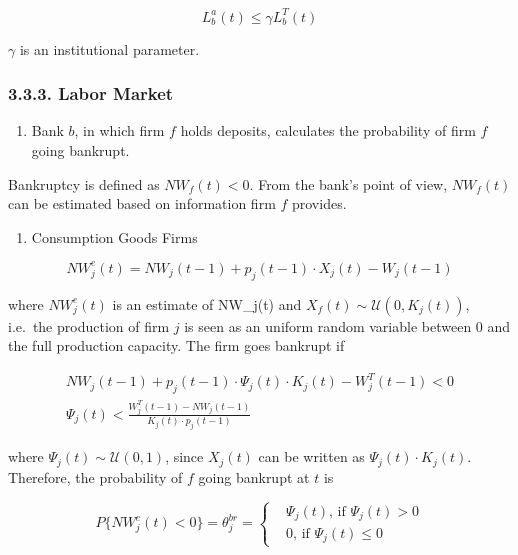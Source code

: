 \documentclass[11pt,]{article}
\providecommand{\tightlist}{%
\setlength{\itemsep}{0pt}\setlength{\parskip}{0pt}}
\begin{document}
\begin{equation}\label{maxloan}
  L_b^a(t) \leq \gamma L^T_b(t)
\end{equation}

\(\gamma\) is an institutional parameter.

\subsubsection{3.3.3. Labor Market}\label{labor-market}

\begin{enumerate}
\def\labelenumi{\alph{enumi}.}
\setcounter{enumi}{2}
\tightlist
\item
  Bank \(b\), in which firm \(f\) holds deposits, calculates the
  probability of firm \(f\) going bankrupt.
\end{enumerate}

Bankruptcy is defined as \(NW_f(t) < 0\). From the bank's point of view,
\(NW_f(t)\) can be estimated based on information firm \(f\) provides.

\begin{enumerate}
\def\labelenumi{\roman{enumi}.}
\tightlist
\item
  Consumption Goods Firms
\end{enumerate}

\begin{equation}
    NW^e_j(t) = NW_j(t-1) + p_j(t-1) \cdot X_j(t) - W_j(t-1)
  \end{equation}

where \(NW^e_j(t)\) is an estimate of NW\_j(t) and
\(X_f(t) \sim \mathcal{U}(0,K_j(t))\), i.e.~the production of firm \(j\)
is seen as an uniform random variable between 0 and the full production
capacity. The firm goes bankrupt if

\begin{equation}
  \begin{split}
    NW_j(t-1) + p_j(t-1) \cdot \Psi_j(t) \cdot K_j(t) - W_j^T(t-1) < 0 \\
    \Psi_j(t) < \frac{W_j^T(t-1) - NW_j(t-1)}{K_j(t) \cdot p_j(t-1)}
  \end{split}
  \end{equation}

where \(\Psi_j(t) \sim \mathcal{U}(0,1)\), since \(X_j(t)\) can be
written as \(\Psi_j(t) \cdot K_j(t)\). Therefore, the probability of
\(f\) going bankrupt at \(t\) is

\begin{equation}
    P\{NW^e_j(t) < 0\} = \theta_j^{br} = 
    \begin{cases}
      & \Psi_j(t) \text{, if } \Psi_j(t) > 0 \\ 
      & 0 \text{, if } \Psi_j(t) \leq 0
    \end{cases}
  \end{equation}
\end{document}
